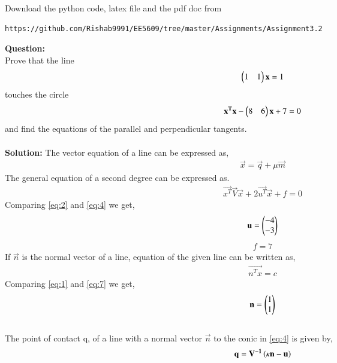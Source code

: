 \documentclass[journal,12pt,twocolumn]{IEEEtran}
\begin{document}
%
Download the python code, latex file and the pdf doc from 
\begin{lstlisting}
https://github.com/Rishab9991/EE5609/tree/master/Assignments/Assignment3.2
\end{lstlisting}
\textbf{Question:}\\
Prove that the line
\begin{align}
\begin{pmatrix}1 & 1\end{pmatrix}\mathbf{x} = 1 \label{eq:1}
\end{align}
touches the circle
\begin{align}
\mathbf{x^T}\mathbf{x} - \begin{pmatrix}8 & 6\end{pmatrix}\mathbf{x} + 7 = 0 \label{eq:2}    
\end{align}
and find the equations of the parallel and perpendicular tangents.\\\\
\textbf{Solution:}
The vector equation of a line can be expressed as, 
\begin{align}
\vec{x} = \vec{q} + \mu\vec{m} \label{eq:3}
\end{align}
The general equation of a second degree can be expressed as.
\begin{align}
\vec{x^T}\vec{V}\vec{x} + 2\vec{u^T}\vec{x} + f = 0 \label{eq:4}
\end{align}
Comparing \eqref{eq:2} and \eqref{eq:4} we get,
\begin{align}
\mathbf{u} = \begin{pmatrix}-4 \\ -3\end{pmatrix} \label{eq:5}
\end{align}
\begin{align}
f = 7 \label{eq:6}    
\end{align}
If $\vec{n}$ is the normal vector of a line, equation of the given line can be written as,
\begin{align}
\vec{n^Tx} = c \label{eq:7}
\end{align}
Comparing \eqref{eq:1} and \eqref{eq:7} we get,
\begin{align}
\mathbf{n} = \begin{pmatrix}1 \\ 1\end{pmatrix} \label{eq:8}
\end{align}\\
The point of contact q, of a line with a normal vector $\vec{n}$ to the conic in \eqref{eq:4} is given by,
\begin{align}
\mathbf{q} = \mathbf{V^{-1}}\left(\kappa\mathbf{n} - \mathbf{u}\right) \label{eq:9}
\end{align}
\end{document}
